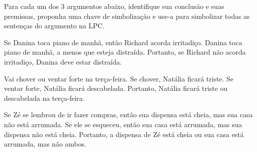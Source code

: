 \problempart
Para cada um dos 3 argumentos abaixo, identifique sua conclusão e suas premissas, proponha uma chave de simbolização e use-a para simbolizar todas as sentenças do argumento na LPC.
\begin{earg}
	\item Se Danina toca piano de manhã, então Richard acorda irritadiço. Danina toca piano de manhã, a menos que esteja distraída. Portanto, se Richard não acorda irritadiço, Danina deve estar distraída.
	\item Vai chover ou ventar forte na terça-feira. Se chover, Natália ficará triste. Se ventar forte, Natália ficará descabelada. Portanto, Natália ficará triste ou descabelada na terça-feira.
	\item Se Zé se lembrou de ir fazer compras, então sua dispensa está cheia, mas sua casa não está arrumada. Se ele se esqueceu, então sua casa está arrumada, mas sua dispensa não está cheia. Portanto, a dispensa de Zé está cheia ou sua casa está arrumada, mas não ambos.
\end{earg}

